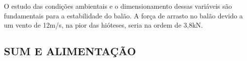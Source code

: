     O estudo das condições ambientais e o dimensionamento dessas variáveis são fundamentais para a estabilidade do balão. A força de arrasto no balão devido a um vento de 12m/s, na pior das hióteses, seria na ordem de 3,8kN.

  
  
  
\subsection{SUM E ALIMENTAÇÃO}

